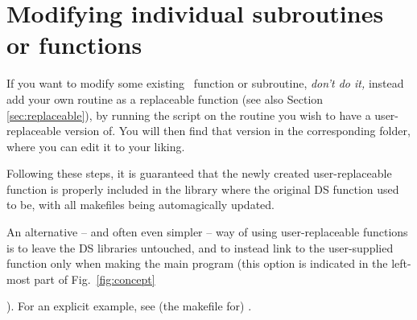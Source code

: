 



\section{Modifying individual subroutines or functions}

 If you want to modify some existing \ds\ function or subroutine, \emph{don't do it,} instead add your own routine as a replaceable function (see also Section \ref{sec:replaceable}), 
 by running the script  on the routine you wish to have a user-replaceable version of.
You will then find that version in the corresponding  folder, 
where you can edit it to your liking. 
{
Following these steps, it is guaranteed that the newly created user-replaceable function
is properly included in the library where the original DS function used to be, with all 
makefiles being automagically updated. 

An alternative -- and often even simpler -- way of using user-replaceable functions is to leave 
the DS libraries untouched, and to 
instead link to the user-supplied function only when making the main program (this option
is indicated in the left-most part of Fig.~\ref{fig:concept}}). For an explicit example,
see (the makefile for) .

